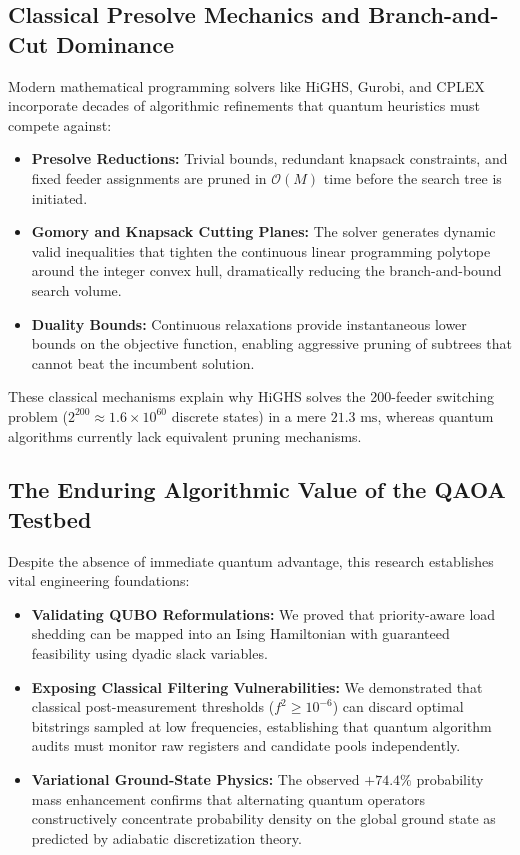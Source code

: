 \documentclass[11pt,a4paper]{article}
\theoremstyle{definition}
\theoremstyle{remark}
\begin{document}
\subsection{Classical Presolve Mechanics and Branch-and-Cut Dominance}
Modern mathematical programming solvers like HiGHS, Gurobi, and CPLEX incorporate decades of algorithmic refinements that quantum heuristics must compete against:
\begin{itemize}
    \item \textbf{Presolve Reductions:} Trivial bounds, redundant knapsack constraints, and fixed feeder assignments are pruned in $\mathcal{O}(M)$ time before the search tree is initiated.
    \item \textbf{Gomory and Knapsack Cutting Planes:} The solver generates dynamic valid inequalities that tighten the continuous linear programming polytope around the integer convex hull, dramatically reducing the branch-and-bound search volume.
    \item \textbf{Duality Bounds:} Continuous relaxations provide instantaneous lower bounds on the objective function, enabling aggressive pruning of subtrees that cannot beat the incumbent solution.
\end{itemize}
These classical mechanisms explain why HiGHS solves the 200-feeder switching problem ($2^{200} \approx 1.6 \times 10^{60}$ discrete states) in a mere $21.3\text{ ms}$, whereas quantum algorithms currently lack equivalent pruning mechanisms.

\subsection{The Enduring Algorithmic Value of the QAOA Testbed}
Despite the absence of immediate quantum advantage, this research establishes vital engineering foundations:
\begin{itemize}
    \item \textbf{Validating QUBO Reformulations:} We proved that priority-aware load shedding can be mapped into an Ising Hamiltonian with guaranteed feasibility using dyadic slack variables.
    \item \textbf{Exposing Classical Filtering Vulnerabilities:} We demonstrated that classical post-measurement thresholds ($f^2 \ge 10^{-6}$) can discard optimal bitstrings sampled at low frequencies, establishing that quantum algorithm audits must monitor raw registers and candidate pools independently.
    \item \textbf{Variational Ground-State Physics:} The observed $+74.4\%$ probability mass enhancement confirms that alternating quantum operators constructively concentrate probability density on the global ground state as predicted by adiabatic discretization theory.
\end{itemize}
\end{document}
